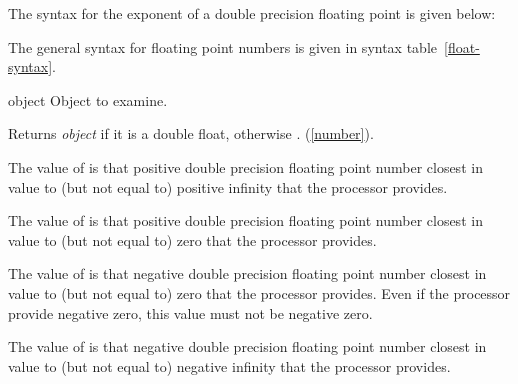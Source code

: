 \begin{optDefinition}
The syntax for the exponent of a double precision floating point is given below:

%

The general syntax for floating point numbers is given in syntax
table~\ref{float-syntax}.

%
\begin{arguments}
    \item[object] Object to examine.
\end{arguments}
%
\result%
Returns {\em object\/} if it is a double float, otherwise \nil{}.
%
\seealso%
 (\ref{number}).

%
\remarks%
The value of  is that positive double
precision floating point number closest in value to (but not equal to) positive
infinity that the processor provides.

%
\remarks%
The value of  is that positive double
precision floating point number closest in value to (but not equal to) zero that
the processor provides.

%
\remarks%
The value of  is that negative double
precision floating point number closest in value to (but not equal to) zero that
the processor provides.  Even if the processor provide negative zero, this value
must not be negative zero.

%
\remarks%
The value of  is that negative double
precision floating point number closest in value to (but not equal to) negative
infinity that the processor provides.


\end{optDefinition}

